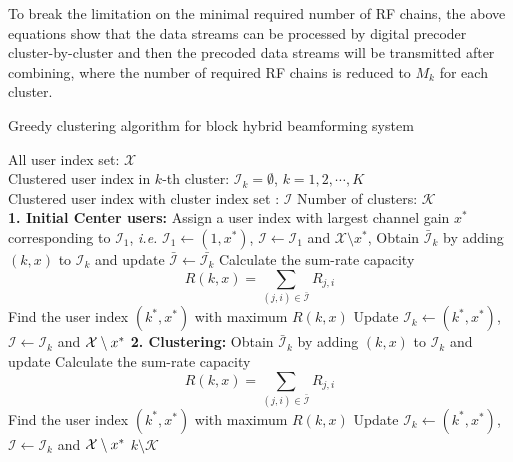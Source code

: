\documentclass[conference]{IEEEtran}
\begin{document}
{ To break the limitation on the minimal required number of RF chains, the above equations show that the data streams can be processed by digital precoder cluster-by-cluster and then the precoded data streams will be transmitted after combining, where the number of required RF chains is reduced to $M_k$ for each cluster.
\begin{algorithm}[h] 		
	\caption{Greedy clustering algorithm for block hybrid beamforming system}
	\label{beam_cluster}
	\begin{algorithmic}[1]
		\REQUIRE  \quad
		\STATE	All user index set: $\mathcal{X}$\\
		\STATE  Clustered user index in $k$-th cluster: $\mathcal{I}_k=\emptyset$, $k=1,2,\cdots, K$\\
		\STATE 	Clustered user index with cluster index set : $\bm{\mathcal{I}}$
		\STATE  Number of clusters: $\mathcal{K}$\\
		\ENSURE   	
		\STATE \textbf{1. Initial Center users:}
		\STATE Assign a user index with largest channel gain $x^*$ corresponding to ${\mathcal I}_1$, {\em i.e.} $\mathcal{I}_1 \leftarrow  (1, x^*)$,  $\bm{\mathcal{I}} \leftarrow \mathcal{I}_1$ and ${\mathcal X}\setminus x^*$,
		\STATE  Obtain $\bar{{\mathcal{I}}}_k$ by adding $(k,x)$ to $\mathcal{I}_k$ and update $\bar{\bm{\mathcal{I}}}\leftarrow \bar{\mathcal{I}_k}$
		\STATE Calculate the sum-rate capacity $$R(k,x)= \sum_{(j,i)\in \bar{\bm{\mathcal{I}}}} R_{j,i}$$
		\ENDFOR
		\STATE Find the user index $(k^*,x^*)$ with maximum $R(k,x)$
		\STATE Update $\mathcal{I}_{k}\leftarrow (k^*, x^*)$, $\bm{\mathcal{I}}\leftarrow \mathcal{I}_k$ and  ${\cal X}\setminus x^*$
		\ENDWHILE
		\STATE \textbf{2. Clustering:}
		\STATE  Obtain $\bar{{\mathcal{I}}}_k$ by adding $(k,x)$ to $\mathcal{I}_k$ and update
		\STATE  Calculate the sum-rate capacity $$R(k,x)= \sum_{(j,i)\in \bar{\bm{\mathcal{I}}}} R_{j,i}$$
		\ENDFOR
		\STATE Find the user index $(k^*,x^*)$ with maximum $R(k,x)$
		\STATE Update $\mathcal{I}_{k}\leftarrow (k^*, x^*)$, $\bm{\mathcal{I}}\leftarrow \mathcal{I}_k$ and  ${\cal X}\setminus x^*$	
		\STATE $k \setminus {\mathcal{K}}$
		\ENDIF
		\ENDFOR	
	\end{algorithmic}
\end{algorithm}


}
\end{document}
